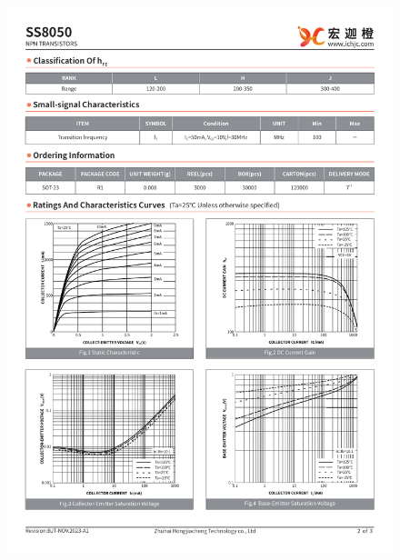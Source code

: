 \documentclass[UTF8]{article}
\begin{document}
\begin{figure}[H]
    \includegraphics[width=\columnwidth]{preview/assets/SS8050_2.pdf}
\end{figure}\vspace*{-5mm}
\end{document}
